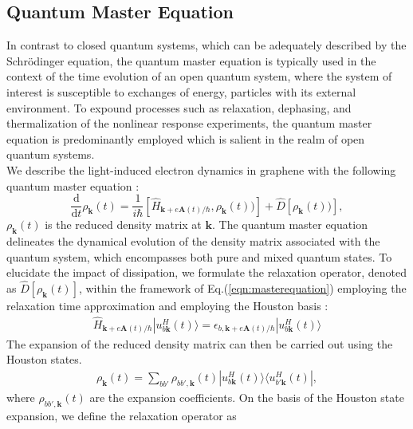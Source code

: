 \subsection{Quantum Master Equation \label{sec:master}}
In contrast to closed quantum systems, which can be adequately described by the Schrödinger equation, the quantum master equation is typically used in the context of the time evolution of an open quantum system, where the system of interest is susceptible to exchanges of energy, particles with its external environment.
To expound processes such as relaxation, dephasing, and thermalization of the nonlinear response experiments, the quantum master equation is predominantly employed which is salient in the realm of open quantum systems.\\
We describe the light-induced electron dynamics in graphene with the following quantum master equation \cite{sato2019light,sato2019microscopic,sato2021high,sato2021nonlinear}:
\begin{equation}
	\frac{\mathrm{d}}{\mathrm{d}t}\rho_{\mathbf{k}}(t) = \frac{1}{i \hbar}	\left[ \hat{H}_{\mathbf{k}+e\mathbf{A}(t)/\hbar}, \rho_{\mathbf{k}} (t)) \right] +
	\hat{D}\left[ \rho_{\mathbf{k}} (t)) \right],
	\label{eqn:masterequation}
\end{equation}
$\rho_{\mathbf k}(t)$ is the reduced density matrix at $\mathbf k$. The quantum master equation delineates the dynamical evolution of the density matrix associated with the quantum system, which encompasses both pure and mixed quantum states.
To elucidate the impact of dissipation, we formulate the relaxation operator, denoted as
$\hat{D}\left[\rho_{\mathbf{k}} (t)\right]$, within the framework of Eq.(\ref{eqn:masterequation})
employing the relaxation time approximation\cite{meier1994coherent} and employing the Houston basis
\cite{PhysRev.57.184, PhysRevB.33.5494}:
\begin{align}
	\hat{H}_{\mathbf{k}+e\mathbf{A}(t)/\hbar} |u^H_{b\mathbf k}(t)\rangle = \epsilon_{b,\mathbf k + e\mathbf A(t)/\hbar}|u^H_{b\mathbf k}(t)\rangle
	\label{eqn:Houston}
\end{align}
The expansion of the reduced density matrix can then be carried out using the Houston states.
\begin{align}
	\rho_{\mathbf k}(t) = \sum_{bb'}\rho_{bb',\mathbf k}(t)|u^H_{b\mathbf k}(t)\rangle \langle u^H_{b'\mathbf k}(t)|,
\end{align}
where $\rho_{bb',\mathbf k}(t)$ are the expansion coefficients. On the basis of the Houston state expansion, we define the relaxation operator \cite{sato2019microscopic,PhysRevB.99.214302,sato2019light} as
